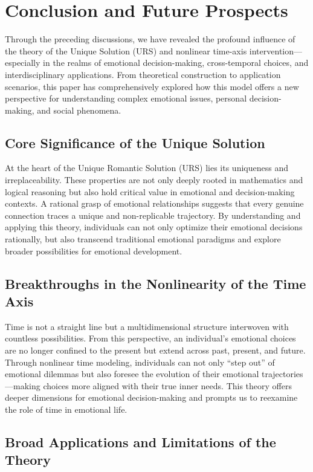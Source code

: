 \documentclass{article}
\begin{document}
\section{Conclusion and Future Prospects}

Through the preceding discussions, we have revealed the profound influence of the theory of the Unique Solution (URS) and nonlinear time-axis intervention—especially in the realms of emotional decision-making, cross-temporal choices, and interdisciplinary applications. From theoretical construction to application scenarios, this paper has comprehensively explored how this model offers a new perspective for understanding complex emotional issues, personal decision-making, and social phenomena.

\subsection{Core Significance of the Unique Solution}

At the heart of the Unique Romantic Solution (URS) lies its uniqueness and irreplaceability. These properties are not only deeply rooted in mathematics and logical reasoning but also hold critical value in emotional and decision-making contexts. A rational grasp of emotional relationships suggests that every genuine connection traces a unique and non-replicable trajectory. By understanding and applying this theory, individuals can not only optimize their emotional decisions rationally, but also transcend traditional emotional paradigms and explore broader possibilities for emotional development.

\subsection{Breakthroughs in the Nonlinearity of the Time Axis}

Time is not a straight line but a multidimensional structure interwoven with countless possibilities. From this perspective, an individual’s emotional choices are no longer confined to the present but extend across past, present, and future. Through nonlinear time modeling, individuals can not only “step out” of emotional dilemmas but also foresee the evolution of their emotional trajectories—making choices more aligned with their true inner needs. This theory offers deeper dimensions for emotional decision-making and prompts us to reexamine the role of time in emotional life.

\subsection{Broad Applications and Limitations of the Theory}
\end{document}
